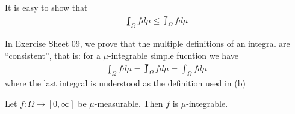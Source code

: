 \begin{rem}[]
  It is easy to show that
  \begin{align*}
    \lowint_{\Omega} f d \mu \leq \upint_{\Omega} f d \mu
  \end{align*}

  In Exercise Sheet 09, we prove that the multiple definitions of an integral are ``consistent'', that is: for a $\mu$-integrable simple fucntion we have
  \begin{align*}
    \lowint_{\Omega} f d \mu = \upint_{\Omega} f d \mu = \int_{\Omega} f d \mu
  \end{align*}
  where the last integral is understood as the definition used in (b)
\end{rem}

\begin{prop}[] \label{prop:measurable-implies-integrable}
  Let $f: \Omega \to [0,\infty]$ be $\mu$-measurable. Then $f$ is $\mu$-integrable.
\end{prop}
